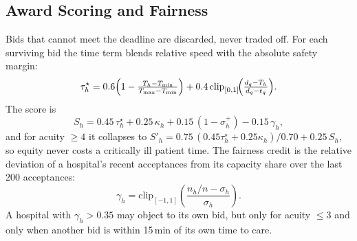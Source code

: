 \subsection{Award Scoring and Fairness}
\label{sec:scoring}
Bids that cannot meet the deadline are discarded, never traded off. For each surviving bid the time term blends relative speed with the absolute safety margin:
\begin{equation}
  \tau^{\star}_h = 0.6\Bigl(1-\tfrac{T_h - T_{\min}}{T_{\max}-T_{\min}}\Bigr) + 0.4\,\mathrm{clip}_{[0,1]}\!\Bigl(\tfrac{d_q - T_h}{d_q - t_q}\Bigr).
  \label{eq:timeterm}
\end{equation}
The score is
\begin{equation}
  S_h = 0.45\,\tau^{\star}_h + 0.25\,\kappa_h + 0.15\,(1-\sigma^{+}_h) - 0.15\,\gamma_h,
  \label{eq:score}
\end{equation}
and for acuity $\ge4$ it collapses to $S'_h=0.75\,(0.45\tau^{\star}_h+0.25\kappa_h)/0.70+0.25\,S_h$, so equity never costs a critically ill patient time. The fairness credit is the relative deviation of a hospital's recent acceptances from its capacity share over the last 200 acceptances:
\begin{equation}
  \gamma_h = \mathrm{clip}_{[-1,1]}\!\left(\frac{n_h/n - \sigma_h}{\sigma_h}\right).
  \label{eq:credit}
\end{equation}
A hospital with $\gamma_h>0.35$ may object to its own bid, but only for acuity $\le3$ and only when another bid is within 15\,min of its own time to care.

